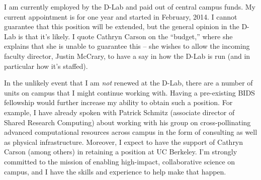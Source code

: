 





I am currently employed by the D-Lab and paid out of central campus funds. My
current appointment is for one year and started in February, 2014. I cannot
guarantee that this position will be extended, but the general opinion in the
D-Lab is that it's likely. I quote Cathryn Carson on the “budget,” where she
explains that she is unable to guarantee this -- she wishes to allow
the incoming faculty director, Justin McCrary, to have a say in how the D-Lab is
run (and in particular how it's staffed).

In the unlikely event that I am \emph{not} renewed at the D-Lab, there are a
number of units on campus that I might continue working with. Having a
pre-existing BIDS fellowship would further increase my ability to obtain such a
position. For example, I have already spoken with Patrick Schmitz (associate
director of Shared Research Computing) about working with his group on
cross-pollinating advanced computational resources across campus in the form of
consulting as well as physical infrastructure. Moreover, I expect to have the
support of Cathryn Carson (among others) in retaining a position at UC Berkeley.
I'm strongly committed to the mission of enabling high-impact, collaborative
science on campus, and I have the skills and experience to help make that
happen.


